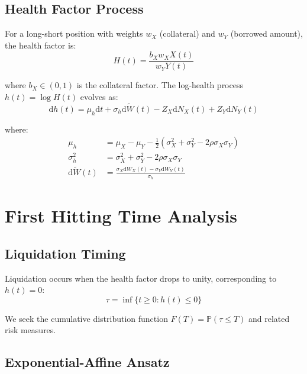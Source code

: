 \documentclass{article}
\renewcommand{\P}{\mathbb{P}}
\newcommand{\diff}{\mathrm{d}}
\theoremstyle{definition}
\begin{document}
\subsection{Health Factor Process}

For a long-short position with weights $w_X$ (collateral) and $w_Y$ (borrowed amount), the health factor is:
\begin{equation}
H(t) = \frac{b_X w_X X(t)}{w_Y Y(t)} \label{eq:health_factor}
\end{equation}

where $b_X \in (0,1)$ is the collateral factor. The log-health process $h(t) = \log H(t)$ evolves as:
\begin{equation}
\diff h(t) = \mu_h \diff t + \sigma_h \diff \tilde{W}(t) - Z_X \diff N_X(t) + Z_Y \diff N_Y(t) \label{eq:log_health}
\end{equation}

where:
\begin{align}
\mu_h &= \mu_X - \mu_Y - \frac{1}{2}(\sigma_X^2 + \sigma_Y^2 - 2\rho\sigma_X\sigma_Y) \\
\sigma_h^2 &= \sigma_X^2 + \sigma_Y^2 - 2\rho\sigma_X\sigma_Y \\
\diff \tilde{W}(t) &= \frac{\sigma_X \diff W_X(t) - \sigma_Y \diff W_Y(t)}{\sigma_h}
\end{align}

\section{First Hitting Time Analysis}

\subsection{Liquidation Timing}

Liquidation occurs when the health factor drops to unity, corresponding to $h(t) = 0$:
\begin{equation}
\tau = \inf\{t \geq 0 : h(t) \leq 0\} \label{eq:stopping_time}
\end{equation}

We seek the cumulative distribution function $F(T) = \P(\tau \leq T)$ and related risk measures.

\subsection{Exponential-Affine Ansatz}
\end{document}
